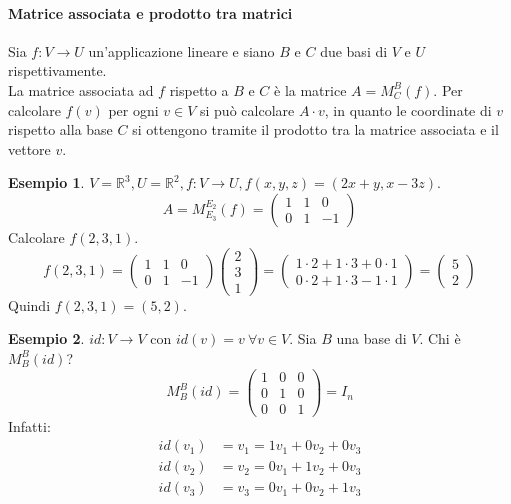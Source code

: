 \documentclass[a4paper]{article}
\theoremstyle{definition}
\newtheorem*{es}{Esempio}
\begin{document}
\paragraph{Matrice associata e prodotto tra matrici}
Sia $f: V \rightarrow U$ un'applicazione lineare e siano $B$ e $C$ due basi di $V$ e $U$ rispettivamente. \\
La matrice associata ad $f$ rispetto a $B$ e $C$ è la matrice $A = M_C^B(f)$.
Per calcolare $f(v)$ per ogni $v \in V$ si può calcolare $A \cdot v$, in quanto le coordinate di $v$ rispetto alla base $C$ si ottengono
tramite il prodotto tra la matrice associata e il vettore $v$.
\begin{es}
	$V = \mathbb{R}^3, U = \mathbb{R}^2, f: V \rightarrow U, f(x, y, z) = (2x + y, x - 3z)$.
	\[ A = M^{E_2}_{E_3}(f) = \begin{pmatrix}
		1 & 1 & 0 \\
		0 & 1 & - 1
	\end{pmatrix} \]
	Calcolare $f(2, 3, 1)$.
	\[ f(2, 3, 1) = \begin{pmatrix}
		1 & 1 & 0 \\
		0 & 1 & - 1
	\end{pmatrix} \begin{pmatrix}
		2 \\
		3 \\
		1
	\end{pmatrix} = \begin{pmatrix}
		1 \cdot 2 + 1 \cdot 3 + 0 \cdot 1 \\
		0 \cdot 2 + 1 \cdot 3 - 1 \cdot 1
	\end{pmatrix} = \begin{pmatrix}
		5 \\
		2
	\end{pmatrix} \]
	Quindi $f(2, 3, 1) = (5, 2)$.
\end{es}
\begin{es}
	$id: V \rightarrow V$ con $id(v) = v \ \forall v \in V$. Sia $B$ una base di $V$.
	Chi è $M_B^B(id)$?
	\[ M_B^B(id) = \begin{pmatrix}
		1 & 0 & 0 \\
		0 & 1 & 0 \\
		0 & 0 & 1
	\end{pmatrix} = I_n \]
	Infatti:
	\begin{align*}
		id(v_1) & = v_1 = 1v_1 + 0v_2 + 0v_3 \\
		id(v_2) & = v_2 = 0v_1 + 1v_2 + 0v_3 \\
		id(v_3) & = v_3 = 0v_1 + 0v_2 + 1v_3
	\end{align*}
\end{es}
\end{document}
